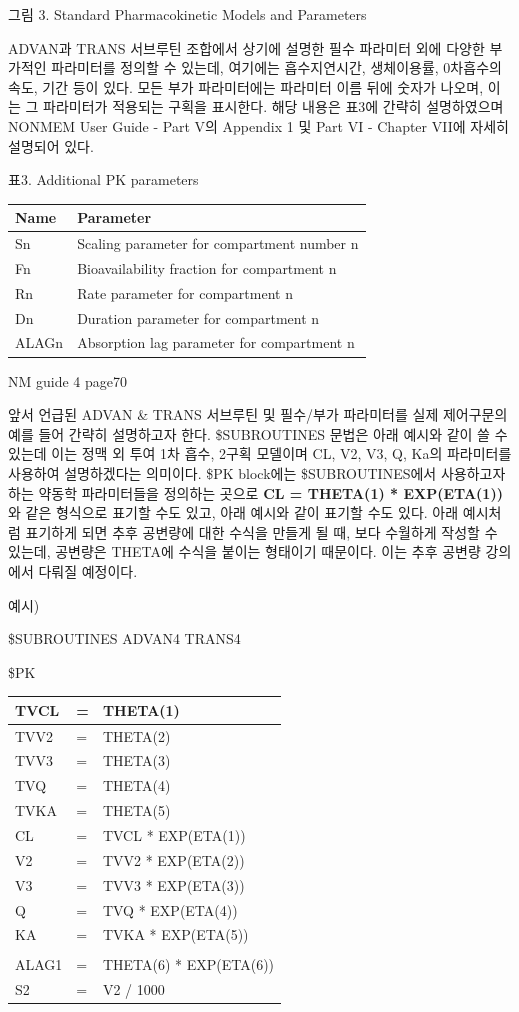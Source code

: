 \documentclass[
  10pt,
]{krantz}
\begin{document}
그림 3. Standard Pharmacokinetic Models and Parameters

ADVAN과 TRANS 서브루틴 조합에서 상기에 설명한 필수 파라미터 외에 다양한 부가적인 파라미터를 정의할 수 있는데, 여기에는
흡수지연시간, 생체이용률, 0차흡수의 속도, 기간 등이 있다. 모든 부가 파라미터에는 파라미터 이름 뒤에 숫자가 나오며, 이는 그
파라미터가 적용되는 구획을 표시한다. 해당 내용은 표3에 간략히 설명하였으며 NONMEM User Guide - Part V의
Appendix 1 및 Part VI - Chapter VII에 자세히 설명되어 있다.

표3. Additional PK parameters

\begin{longtable}[]{@{}ll@{}}
\toprule
\textbf{Name} & \textbf{Parameter}\tabularnewline
\midrule
\endhead
Sn & Scaling parameter for compartment number n\tabularnewline
Fn & Bioavailability fraction for compartment n\tabularnewline
Rn & Rate parameter for compartment n\tabularnewline
Dn & Duration parameter for compartment n\tabularnewline
ALAGn & Absorption lag parameter for compartment n\tabularnewline
\bottomrule
\end{longtable}

NM guide 4 page70

앞서 언급된 ADVAN \& TRANS 서브루틴 및 필수/부가 파라미터를 실제 제어구문의 예를 들어 간략히 설명하고자 한다.
\$SUBROUTINES 문법은 아래 예시와 같이 쓸 수 있는데 이는 정맥 외 투여 1차 흡수, 2구획 모델이며 CL, V2,
V3, Q, Ka의 파라미터를 사용하여 설명하겠다는 의미이다. \$PK block에는 \$SUBROUTINES에서 사용하고자 하는
약동학 파라미터들을 정의하는 곳으로 \textbf{CL = THETA(1) * EXP(ETA(1))} 와 같은 형식으로 표기할
수도 있고, 아래 예시와 같이 표기할 수도 있다. 아래 예시처럼 표기하게 되면 추후 공변량에 대한 수식을 만들게 될 때,
보다 수월하게 작성할 수 있는데, 공변량은 THETA에 수식을 붙이는 형태이기 때문이다. 이는 추후 공변량 강의에서 다뤄질
예정이다.

예시)

\$SUBROUTINES ADVAN4 TRANS4

\$PK

\begin{longtable}[]{@{}lll@{}}
\toprule
TVCL & = & THETA(1)\tabularnewline
\midrule
\endhead
TVV2 & = & THETA(2)\tabularnewline
TVV3 & = & THETA(3)\tabularnewline
TVQ & = & THETA(4)\tabularnewline
TVKA & = & THETA(5)\tabularnewline
CL & = & TVCL * EXP(ETA(1))\tabularnewline
V2 & = & TVV2 * EXP(ETA(2))\tabularnewline
V3 & = & TVV3 * EXP(ETA(3))\tabularnewline
Q & = & TVQ * EXP(ETA(4))\tabularnewline
KA & = & TVKA * EXP(ETA(5))\tabularnewline
& &\tabularnewline
ALAG1 & = & THETA(6) * EXP(ETA(6))\tabularnewline
S2 & = & V2 / 1000\tabularnewline
\bottomrule
\end{longtable}
\end{document}
